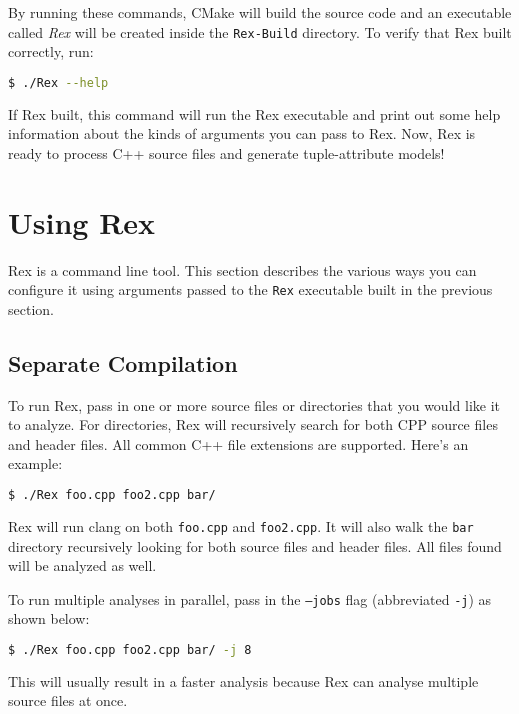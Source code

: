\noindent By running these commands, CMake will build the source code and an
executable called \textit{Rex} will be created inside the \texttt{Rex-Build}
directory. To verify that Rex built correctly, run:

\begin{lstlisting}[language=bash]
	$ ./Rex --help
\end{lstlisting}

\noindent If Rex built, this command will run the Rex executable and print out
some help information about the kinds of arguments you can pass to Rex. Now, Rex
is ready to process C++ source files and generate tuple-attribute models!

\section{Using Rex}

Rex is a command line tool. This section describes the various ways you can
configure it using arguments passed to the \texttt{Rex} executable built in the
previous section.

\subsection{Separate Compilation}

To run Rex, pass in one or more source files or directories that you would like
it to analyze. For directories, Rex will recursively search for both CPP source
files and header files. All common C++ file extensions are supported. Here's an
example:

\begin{lstlisting}[language=bash]
	$ ./Rex foo.cpp foo2.cpp bar/
\end{lstlisting}

\noindent Rex will run clang on both \texttt{foo.cpp} and \texttt{foo2.cpp}. It
will also walk the \texttt{bar} directory recursively looking for both source
files and header files. All files found will be analyzed as well.

\bigskip

\noindent To run multiple analyses in parallel, pass in the \texttt{--jobs} flag
(abbreviated \texttt{-j}) as shown below:

\begin{lstlisting}[language=bash]
	$ ./Rex foo.cpp foo2.cpp bar/ -j 8
\end{lstlisting}

\noindent This will usually result in a faster analysis because Rex can analyse
multiple source files at once.

